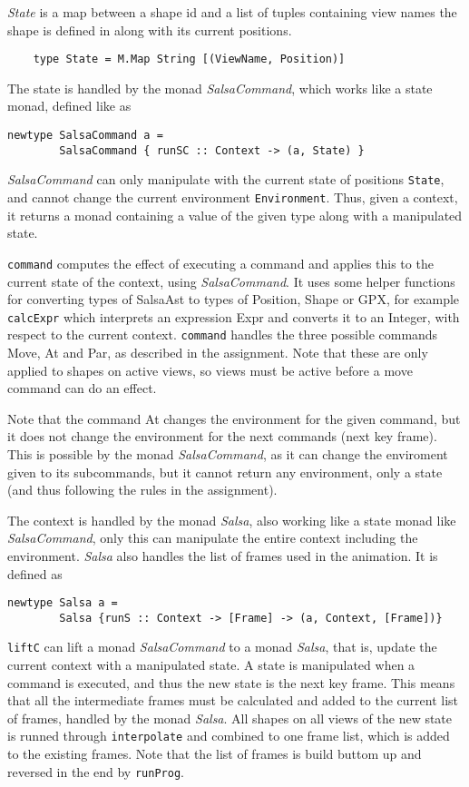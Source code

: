 \documentclass[a4paper, 10pt]{article}
\begin{document}
\textit{State} is a map between a shape id and a list of tuples containing view names the shape is defined in along with its current positions.
\begin{verbatim}
    type State = M.Map String [(ViewName, Position)]
\end{verbatim}

The state is handled by the monad \textit{SalsaCommand}, which works like a state monad, defined like as
\begin{verbatim}
newtype SalsaCommand a = 
        SalsaCommand { runSC :: Context -> (a, State) }
\end{verbatim}
\textit{SalsaCommand} can only manipulate with the current state of positions \texttt{State}, and cannot change the current environment \texttt{Environment}. Thus, given a context, it returns a monad containing a value of the given type along with a manipulated state.

\texttt{command} computes the effect of executing a command and applies this to the current state of the context, using \textit{SalsaCommand}. It uses some helper functions for converting types of SalsaAst to types of Position, Shape or GPX, for example \texttt{calcExpr} which interprets an expression Expr and converts it to an Integer, with respect to the current context. \texttt{command} handles the three possible commands Move, At and Par, as described in the assignment. Note that these are only applied to shapes on active views, so views must be active before a move command can do an effect.

Note that the command At changes the environment for the given command, but it does not change the environment for the next commands (next key frame). This is possible by the monad \textit{SalsaCommand}, as it can change the enviroment given to its subcommands, but it cannot return any environment, only a state (and thus following the rules in the assignment).

The context is handled by the monad \textit{Salsa}, also working like a state monad like \textit{SalsaCommand}, only this can manipulate the entire context including the environment. \textit{Salsa} also handles the list of frames used in the animation. It is defined as
\begin{verbatim}
newtype Salsa a = 
        Salsa {runS :: Context -> [Frame] -> (a, Context, [Frame])}
\end{verbatim}

\texttt{liftC} can lift a monad \textit{SalsaCommand} to a monad \textit{Salsa}, that is, update the current context with a manipulated state. A state is manipulated when a command is executed, and thus the new state is the next key frame. This means that all the intermediate frames must be calculated and added to the current list of frames, handled by the monad \textit{Salsa}. All shapes on all views of the new state is runned through \texttt{interpolate} and combined to one frame list, which is added to the existing frames. Note that the list of frames is build buttom up and reversed in the end by \texttt{runProg}.
\end{document}
